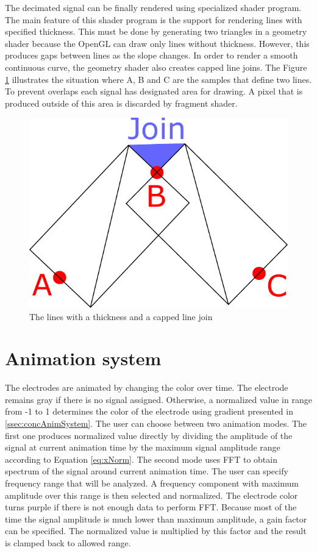 The decimated signal can be finally rendered using specialized shader program. The main feature of this shader program is the support for rendering lines with specified thickness. This must be done by generating two triangles in a geometry shader because the OpenGL can draw only lines without thickness. However, this produces gaps between lines as the slope changes. In order to render a smooth continuous curve, the geometry shader also creates capped line joins. The Figure \ref{fig:LinesAndJoin} illustrates the situation where A, B and C are the samples that define two lines. To prevent overlaps each signal has designated area for drawing. A pixel that is produced outside of this area is discarded by fragment shader.

\begin{figure}[ht]
	\centering
	\includegraphics[width=0.6\linewidth, height=0.2\textheight]{fig/linesAndJoin.pdf}
	\caption{The lines with a thickness and a capped line join}
	\label{fig:LinesAndJoin}
\end{figure}

\section{Animation system}
\label{sec:animSystem}
The electrodes are animated by changing the color over time. The electrode remains gray if there is no signal assigned. Otherwise, a normalized value in range from -1 to 1 determines the color of the electrode using gradient presented in \ref{ssec:concAnimSystem}. The user can choose between two animation modes. The first one produces normalized value directly by dividing the amplitude of the signal at current animation time by the maximum signal amplitude range according to Equation \ref{eq:xNorm}. The second mode uses FFT to obtain spectrum of the signal around current animation time. The user can specify frequency range that will be analyzed. A frequency component with maximum amplitude over this range is then selected and normalized. The electrode color turns purple if there is not enough data to perform FFT. Because most of the time the signal amplitude is much lower than maximum amplitude, a gain factor can be specified. The normalized value is multiplied by this factor and the result is clamped back to allowed range.

